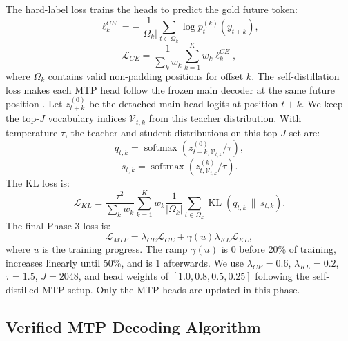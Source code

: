 \documentclass[11pt]{article}
\begin{document}
The hard-label loss trains the heads to predict the gold future token:
\begin{equation}
\ell_k^{CE}
=-\frac{1}{|\Omega_k|}
\sum_{t\in\Omega_k}\log p_t^{(k)}(y_{t+k}),
\end{equation}
\begin{equation}
\mathcal{L}_{CE}
=\frac{1}{\sum_k w_k}
\sum_{k=1}^{K}w_k\ell_k^{CE},
\end{equation}
where $\Omega_k$ contains valid non-padding positions for offset $k$.
The self-distillation loss makes each MTP head follow the frozen main decoder at the same future position \citep{hinton2015distilling}.
Let $z_{t+k}^{(0)}$ be the detached main-head logits at position $t+k$.
We keep the top-$J$ vocabulary indices $\mathcal{V}_{t,k}$ from this teacher distribution.
With temperature $\tau$, the teacher and student distributions on this top-$J$ set are:
\begin{equation}
q_{t,k}=\operatorname{softmax}(z_{t+k,\mathcal{V}_{t,k}}^{(0)}/\tau),
\end{equation}
\begin{equation}
s_{t,k}=\operatorname{softmax}(z_{t,\mathcal{V}_{t,k}}^{(k)}/\tau).
\end{equation}
The KL loss is:
\begin{equation}
\mathcal{L}_{KL}
=\frac{\tau^2}{\sum_k w_k}
\sum_{k=1}^{K}w_k
\frac{1}{|\Omega_k|}
\sum_{t\in\Omega_k}\operatorname{KL}(q_{t,k}\,\|\,s_{t,k}).
\end{equation}
The final Phase 3 loss is:
\begin{equation}
\mathcal{L}_{MTP}
=\lambda_{CE}\mathcal{L}_{CE}
+\gamma(u)\lambda_{KL}\mathcal{L}_{KL},
\end{equation}
where $u$ is the training progress.
The ramp $\gamma(u)$ is 0 before 20\% of training, increases linearly until 50\%, and is 1 afterwards.
We use $\lambda_{CE}=0.6$, $\lambda_{KL}=0.2$, $\tau=1.5$, $J=2048$, and head weights of $[1.0, 0.8, 0.5, 0.25]$ following the self-distilled MTP setup.
Only the MTP heads are updated in this phase.

\subsection{Verified MTP Decoding Algorithm}
\end{document}

